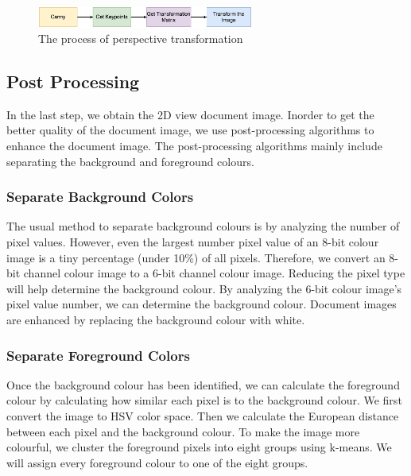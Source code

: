 \documentclass[10pt, conference, compsocconf]{IEEEtran}
\begin{document}
\begin{figure}[!h]
	\centering
	\includegraphics[width=2.8in]{./Assets/123.jpg}
	\caption{The process of perspective transformation}
\end{figure}

\subsection{Post Processing}

\label{post-process}

In the last step, we obtain the 2D view document image. Inorder to get the better quality of the document image, we use post-processing algorithms to enhance the document image. The post-processing algorithms mainly include separating the background and foreground colours.

\subsubsection{Separate Background Colors}

The usual method to separate background colours is by analyzing the number of pixel values.
However, even the largest number pixel value of an 8-bit colour image is a tiny percentage (under 10\%) of all pixels.
Therefore, we convert an 8-bit channel colour image to a 6-bit channel colour image.
Reducing the pixel type will help determine the background colour.
By analyzing the 6-bit colour image's pixel value number, we can determine the background colour. Document images are enhanced by replacing the background colour with white.

\subsubsection{Separate Foreground Colors}

\label{separate-foreground-colors}
Once the background colour has been identified, we can calculate the foreground colour by calculating how similar each pixel is to the background colour.
We first convert the image to HSV color space.
Then we calculate the European distance between each pixel and the background colour.
To make the image more colourful, we cluster the foreground pixels into eight groups using k-means\cite{hartigan1979algorithm}. 
We will assign every foreground colour to one of the eight groups. 
\end{document}
